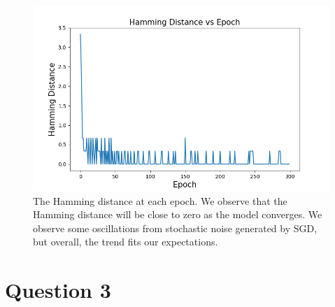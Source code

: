 \documentclass[
	12pt, %
]{../Template/fphw}
\begin{document}
\begin{figure}[!htbp]
    \centering
    \includegraphics[width=0.9\linewidth]{HW1/q3.png}
    \caption{The Hamming distance at each epoch. We observe that the Hamming distance will be close to zero as the model converges. We observe some oscillations from stochastic noise generated by SGD, but overall, the trend fits our expectations.}
    \label{fig: q3}
\end{figure}

\section*{Question 3}
\end{document}
